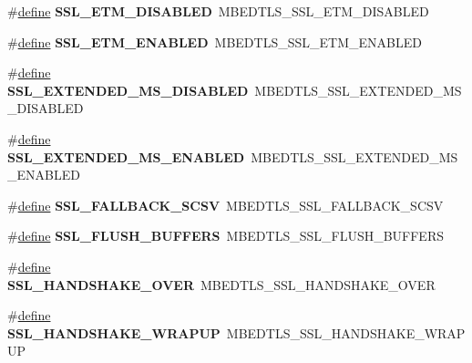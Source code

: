 \begin{DoxyCompactItemize}
\#\hyperlink{structdefine}{define} {\bfseries S\+S\+L\+\_\+\+E\+T\+M\+\_\+\+D\+I\+S\+A\+B\+L\+ED}~M\+B\+E\+D\+T\+L\+S\+\_\+\+S\+S\+L\+\_\+\+E\+T\+M\+\_\+\+D\+I\+S\+A\+B\+L\+ED
\item 
\mbox{\label{compat-1_83_8h_a49d0a70c0eedf151c79e169e3d462e13}} 
\#\hyperlink{structdefine}{define} {\bfseries S\+S\+L\+\_\+\+E\+T\+M\+\_\+\+E\+N\+A\+B\+L\+ED}~M\+B\+E\+D\+T\+L\+S\+\_\+\+S\+S\+L\+\_\+\+E\+T\+M\+\_\+\+E\+N\+A\+B\+L\+ED
\item 
\mbox{\label{compat-1_83_8h_af9f02572f8754d4827e1a71b960cafaf}} 
\#\hyperlink{structdefine}{define} {\bfseries S\+S\+L\+\_\+\+E\+X\+T\+E\+N\+D\+E\+D\+\_\+\+M\+S\+\_\+\+D\+I\+S\+A\+B\+L\+ED}~M\+B\+E\+D\+T\+L\+S\+\_\+\+S\+S\+L\+\_\+\+E\+X\+T\+E\+N\+D\+E\+D\+\_\+\+M\+S\+\_\+\+D\+I\+S\+A\+B\+L\+ED
\item 
\mbox{\label{compat-1_83_8h_a432cca2effb4678a474f0536f8ab51a2}} 
\#\hyperlink{structdefine}{define} {\bfseries S\+S\+L\+\_\+\+E\+X\+T\+E\+N\+D\+E\+D\+\_\+\+M\+S\+\_\+\+E\+N\+A\+B\+L\+ED}~M\+B\+E\+D\+T\+L\+S\+\_\+\+S\+S\+L\+\_\+\+E\+X\+T\+E\+N\+D\+E\+D\+\_\+\+M\+S\+\_\+\+E\+N\+A\+B\+L\+ED
\item 
\mbox{\label{compat-1_83_8h_ac54e7a26d05421b1a8105864ce9a486d}} 
\#\hyperlink{structdefine}{define} {\bfseries S\+S\+L\+\_\+\+F\+A\+L\+L\+B\+A\+C\+K\+\_\+\+S\+C\+SV}~M\+B\+E\+D\+T\+L\+S\+\_\+\+S\+S\+L\+\_\+\+F\+A\+L\+L\+B\+A\+C\+K\+\_\+\+S\+C\+SV
\item 
\mbox{\label{compat-1_83_8h_afd3c0220986c9d2ece9f58c5c2e3b4c2}} 
\#\hyperlink{structdefine}{define} {\bfseries S\+S\+L\+\_\+\+F\+L\+U\+S\+H\+\_\+\+B\+U\+F\+F\+E\+RS}~M\+B\+E\+D\+T\+L\+S\+\_\+\+S\+S\+L\+\_\+\+F\+L\+U\+S\+H\+\_\+\+B\+U\+F\+F\+E\+RS
\item 
\mbox{\label{compat-1_83_8h_a96be469a65bac699a970984d82526131}} 
\#\hyperlink{structdefine}{define} {\bfseries S\+S\+L\+\_\+\+H\+A\+N\+D\+S\+H\+A\+K\+E\+\_\+\+O\+V\+ER}~M\+B\+E\+D\+T\+L\+S\+\_\+\+S\+S\+L\+\_\+\+H\+A\+N\+D\+S\+H\+A\+K\+E\+\_\+\+O\+V\+ER
\item 
\mbox{\label{compat-1_83_8h_ae9fa622f5ca76455f8c69055d07e8e1f}} 
\#\hyperlink{structdefine}{define} {\bfseries S\+S\+L\+\_\+\+H\+A\+N\+D\+S\+H\+A\+K\+E\+\_\+\+W\+R\+A\+P\+UP}~M\+B\+E\+D\+T\+L\+S\+\_\+\+S\+S\+L\+\_\+\+H\+A\+N\+D\+S\+H\+A\+K\+E\+\_\+\+W\+R\+A\+P\+UP

\end{DoxyCompactItemize}
